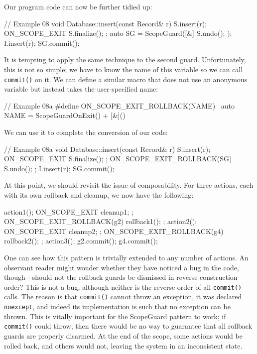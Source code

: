 Our program code can now be further tidied up:

\begin{code}
// Example 08
void Database::insert(const Record& r) {
  S.insert(r);
  ON_SCOPE_EXIT { S.finalize(); };
  auto SG = ScopeGuard([&] { S.undo(); });
  I.insert(r);
  SG.commit();
}
\end{code}

It is tempting to apply the same technique to the second guard. Unfortunately, this is not so simple; we have to know the name of this variable so we can call \texttt{commit()} on it. We can define a similar macro that does not use an anonymous variable but instead takes the user-specified name:

\begin{code}
// Example 08a
#define ON_SCOPE_EXIT_ROLLBACK(NAME) \
  auto NAME = ScopeGuardOnExit() + [&]()
\end{code}

We can use it to complete the conversion of our code:

\begin{code}
// Example 08a
void Database::insert(const Record& r) {
  S.insert(r);
  ON_SCOPE_EXIT { S.finalize(); };
  ON_SCOPE_EXIT_ROLLBACK(SG){ S.undo(); };
  I.insert(r);
  SG.commit();
}
\end{code}

At this point, we should revisit the issue of composability. For three actions, each with its own rollback and cleanup, we now have the following:

\begin{code}
action1();
ON_SCOPE_EXIT { cleanup1; };
ON_SCOPE_EXIT_ROLLBACK(g2){ rollback1(); };
action2();
ON_SCOPE_EXIT { cleanup2; };
ON_SCOPE_EXIT_ROLLBACK(g4){ rollback2(); };
action3();
g2.commit();
g4.commit();
\end{code}

One can see how this pattern is trivially extended to any number of actions. An observant reader might wonder whether they have noticed a bug in the code, though---should not the rollback guards be dismissed in reverse construction order? This is not a bug, although neither is the reverse order of all \texttt{commit()} calls. The reason is that \texttt{commit()} cannot throw an exception, it was declared \texttt{noexcept}, and indeed its implementation is such that no exception can be thrown. This is vitally important for the ScopeGuard pattern to work; if \texttt{commit()} could throw, then there would be no way to guarantee that all rollback guards are properly disarmed. At the end of the scope, some actions would be rolled back, and others would not, leaving the system in an inconsistent state.

